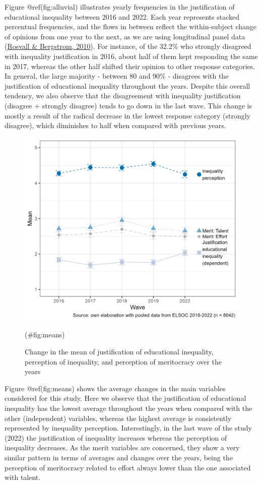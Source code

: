 \documentclass[
  12pt,
  a4paper,
]{article}
\begin{document}
Figure @ref(fig:alluvial) illustrates yearly frequencies in the
justification of educational inequality between 2016 and 2022. Each year
represents stacked percentual frequencies, and the flows in between
reflect the within-subject change of opinions from one year to the next,
as we are using longitudinal panel data
(\protect\hyperlink{ref-rosvall_mapping_2010}{Rosvall \& Bergstrom,
2010}). For instance, of the 32.2\% who strongly disagreed with
inequality justification in 2016, about half of them kept responding the
same in 2017, whereas the other half shifted their opinion to other
response categories. In general, the large majority - between 80 and
90\% - disagrees with the justification of educational inequality
throughout the years. Despite this overall tendency, we also observe
that the disagreement with inequality justification (disagree + strongly
disagree) tends to go down in the last wave. This change is mostly a
result of the radical decrease in the lowest response category (strongly
disagree), which diminishes to half when compared with previous years.

\begin{figure}[H]

{\centering \includegraphics[width=0.85\linewidth]{output/graphs/years_plot} 

}

\caption{Change in the mean of justification of educational inequality, perception of inequality, and perception of meritocracy over the years}(\#fig:means)
\end{figure}

Figure @ref(fig:means) shows the average changes in the main variables
considered for this study. Here we observe that the justification of
educational inequality has the lowest average throughout the years when
compared with the other (independent) variables, whereas the highest
average is consistently represented by inequality perception.
Interestingly, in the last wave of the study (2022) the justification of
inequality increases whereas the perception of inequality decreases. As
the merit variables are concerned, they show a very similar pattern in
terms of averages and changes over the years, being the perception of
meritocracy related to effort always lower than the one associated with
talent.
\end{document}
